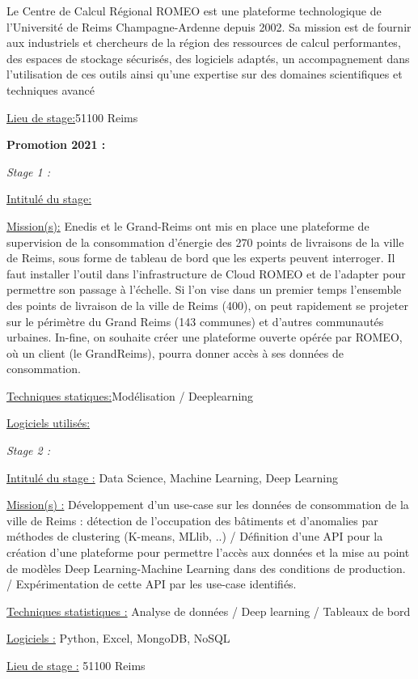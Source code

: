 \documentclass[
  letterpaper,
  DIV=11,
  numbers=noendperiod]{scrreprt}
\begin{document}
Le Centre de Calcul Régional ROMEO est une plateforme technologique de
l'Université de Reims Champagne-Ardenne depuis 2002. Sa mission est de
fournir aux industriels et chercheurs de la région des ressources de
calcul performantes, des espaces de stockage sécurisés, des logiciels
adaptés, un accompagnement dans l'utilisation de ces outils ainsi qu'une
expertise sur des domaines scientifiques et techniques avancé

\uline{Lieu de stage:}51100 Reims

\textbf{Promotion 2021 :}

\emph{Stage 1 :}

\uline{Intitulé du stage:}

\uline{Mission(s):} Enedis et le Grand-Reims ont mis en place une
plateforme de supervision de la consommation d'énergie des 270 points de
livraisons de la ville de Reims, sous forme de tableau de bord que les
experts peuvent interroger. Il faut installer l'outil dans
l'infrastructure de Cloud ROMEO et de l'adapter pour permettre son
passage à l'échelle. Si l'on vise dans un premier temps l'ensemble des
points de livraison de la ville de Reims (400), on peut rapidement se
projeter sur le périmètre du Grand Reims (143 communes) et d'autres
communautés urbaines. In-fine, on souhaite créer une plateforme ouverte
opérée par ROMEO, où un client (le GrandReims), pourra donner accès à
ses données de consommation.

\uline{Techniques statiques:}Modélisation / Deeplearning

\uline{Logiciels utilisés:}

\emph{Stage 2 :}

\uline{Intitulé du stage :} Data Science, Machine Learning, Deep
Learning

\uline{Mission(s) :} Développement d'un use-case sur les données de
consommation de la ville de Reims : détection de l'occupation des
bâtiments et d'anomalies par méthodes de clustering (K-means, MLlib, ..)
/ Définition d'une API pour la création d'une plateforme pour permettre
l'accès aux données et la mise au point de modèles Deep Learning-Machine
Learning dans des conditions de production. / Expérimentation de cette
API par les use-case identifiés.

\uline{Techniques statistiques :} Analyse de données / Deep learning /
Tableaux de bord

\uline{Logiciels :} Python, Excel, MongoDB, NoSQL

\uline{Lieu de stage :} 51100 Reims
\end{document}
